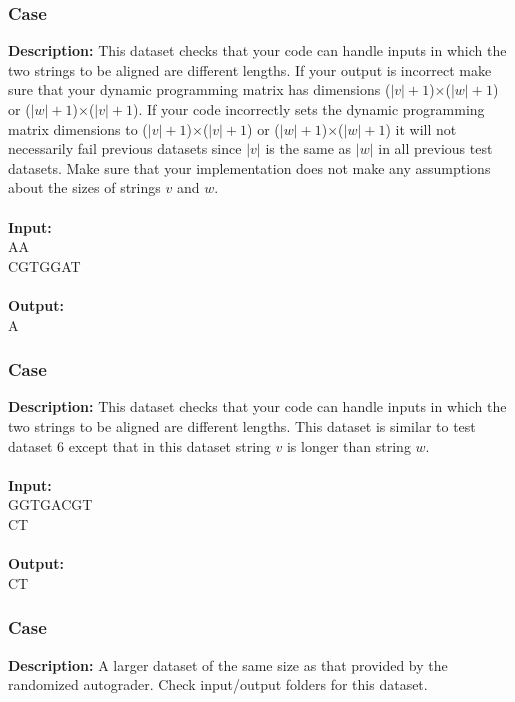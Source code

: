 \documentclass{article}
\newcommand{\code}[1]{{\fontfamily{pcr}\selectfont #1}}
\begin{document}
\subsubsection*{Case }
\hline \vspace{5}
\textbf{Description:} This dataset checks that your code can handle inputs in which the two strings to be aligned are different lengths. If your output is incorrect make sure that your dynamic programming matrix has dimensions ($|v|+1$)$\times$($|w|+1$) or ($|w|+1$)$\times$($|v|+1$). If your code incorrectly sets the dynamic programming matrix dimensions to ($|v|+1$)$\times$($|v|+1$) or ($|w|+1$)$\times$($|w|+1$) it will not necessarily fail previous datasets since $|v|$ is the same as $|w|$ in all previous test datasets. Make sure that your implementation does not make any assumptions about the sizes of strings $v$ and $w$.\\ \\
\noindent \textbf{Input:}\\
\code{AA\\CGTGGAT}\\ \\
\noindent \textbf{Output:}\\
\code{A}
\pagebreak

\subsubsection*{Case }
\hline \vspace{5}
\textbf{Description:} This dataset checks that your code can handle inputs in which the two strings to be aligned are different lengths. This dataset is similar to test dataset $6$ except that in this dataset string $v$ is longer than string $w$.\\ \\
\noindent \textbf{Input:}\\
\code{GGTGACGT\\CT}\\ \\
\noindent \textbf{Output:}\\
\code{CT}

\subsubsection*{Case }
\hline \vspace{5}
\textbf{Description:} A larger dataset of the same size as that provided by the randomized autograder. Check input/output folders for this dataset.\\ \\
\pagebreak
\end{document}
